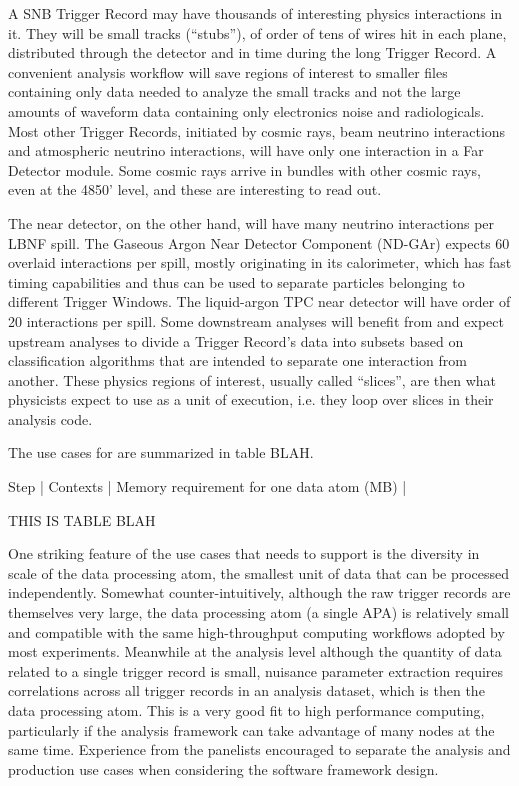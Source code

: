 \documentclass[../main-v1.tex]{subfiles}
\begin{document}
A SNB Trigger Record may have thousands of interesting physics interactions in it.  They will be small tracks (“stubs”), of order of tens of wires hit in each plane, distributed through the detector and in time during the long Trigger Record.  A convenient analysis workflow will save regions of interest to smaller files containing only data needed to analyze the small tracks and not the large amounts of waveform data containing only electronics noise and radiologicals.  Most other Trigger Records, initiated by cosmic rays, beam neutrino interactions and atmospheric neutrino interactions, will have only one interaction in a Far Detector module.  Some cosmic rays arrive in bundles with other cosmic rays, even at the 4850’ level, and these are interesting to read out.

The near detector, on the other hand, will have many neutrino interactions per LBNF spill.  The Gaseous Argon Near Detector Component (ND-GAr) expects 60 overlaid interactions per spill, mostly originating in its calorimeter, which has fast timing capabilities and thus can be used to separate particles belonging to different Trigger Windows.  The liquid-argon TPC near detector will have order of 20 interactions per spill.  Some downstream analyses will benefit from and expect upstream analyses to divide a Trigger Record’s data into subsets based on classification algorithms that are intended to separate one interaction from another.  These physics regions of interest, usually called “slices”, are then what physicists expect to use as a unit of execution, i.e. they loop over slices in their analysis code.


The use cases for  are summarized in table BLAH.

Step | Contexts | Memory requirement for one data atom (MB) |

THIS IS TABLE BLAH


One striking feature of the use cases that  needs to support is the diversity in scale of the data processing atom, the smallest unit of data that can be processed independently.  Somewhat counter-intuitively, although the raw trigger records are themselves very large, the data processing atom (a single APA) is relatively small and compatible with the same high-throughput computing workflows adopted by most  experiments.  Meanwhile at the analysis level although the quantity of data related to a single trigger record is small, nuisance parameter extraction requires correlations across all trigger records in an analysis dataset, which is then the data processing atom.  This is a very good fit to high performance computing, particularly if the analysis framework can take advantage of many  nodes at the same time. Experience from the  panelists encouraged  to separate the analysis and production use cases when considering the software framework design.
\end{document}
